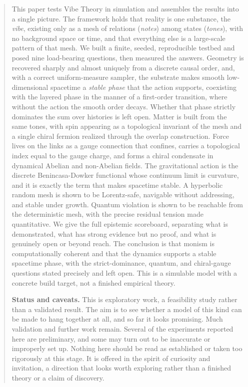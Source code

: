 \begin{abstract}
This paper tests Vibe Theory in simulation and assembles the results into a single picture. The framework holds that reality is one substance, the \emph{vibe}, existing only as a mesh of relations (\emph{notes}) among states (\emph{tones}), with no background space or time, and that everything else is a large-scale pattern of that mesh. We built a finite, seeded, reproducible testbed and posed nine load-bearing questions, then measured the answers. Geometry is recovered sharply and almost uniquely from a discrete causal order, and, with a correct uniform-measure sampler, the substrate makes smooth low-dimensional spacetime a \emph{stable phase} that the action supports, coexisting with the layered phase in the manner of a first-order transition, where without the action the smooth order decays. Whether that phase strictly dominates the sum over histories is left open. Matter is built from the same tones, with spin appearing as a topological invariant of the mesh and a single chiral fermion realized through the overlap construction. Force lives on the links as a gauge connection that confines, carries a topological index equal to the gauge charge, and forms a chiral condensate in dynamical Abelian and non-Abelian fields. The gravitational action is the discrete Benincasa-Dowker functional whose continuum limit is curvature, and it is exactly the term that makes spacetime stable. A hyperbolic random mesh is shown to be Lorentz-safe, navigable without addressing, and stable under growth. Quantum violation is shown to be reachable from the deterministic mesh, with the precise residual tension made quantitative. We give the full epistemic scoreboard, separating what is demonstrated, what has strong evidence but no proof, and what is genuinely open or beyond reach. The conclusion is that monism is computationally coherent and that the dynamics supports a stable spacetime phase, with the strict-dominance, quantum, and chiral-gauge questions stated precisely and left open. This is a simulable model with a concrete build target, not a finished empirical theory.
\medskip

\noindent\textbf{Status and caveats.} This is exploratory work, a feasibility study rather than a validated result. The aim is to see whether a model of this kind can be made to hang together at all, and so far it looks promising. Much validation and further work remain. Several of the experiments reported here are preliminary, and some may turn out to be inaccurate or improperly set up. Nothing here should be read as established or taken too rigorously at this stage. It is offered in the spirit of curiosity and invitation, a direction that looks worth exploring rather than a finished theory or a claim of discovery.
\end{abstract}
